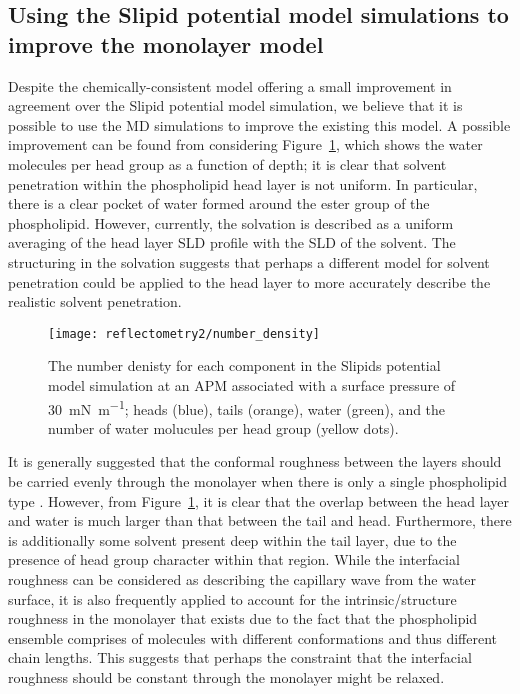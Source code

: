 \subsection{Using the Slipid potential model simulations to improve the monolayer model}
Despite the chemically-consistent model offering a small improvement in agreement over the Slipid potential model simulation, we believe that it is possible to use the MD simulations to improve the existing this model.
A possible improvement can be found from considering Figure~\ref{fig:nd}, which shows the water molecules per head group as a function of depth; it is clear that solvent penetration within the phospholipid head layer is not uniform.
In particular, there is a clear pocket of water formed around the ester group of the phospholipid.
However, currently, the solvation is described as a uniform averaging of the head layer SLD profile with the SLD of the solvent.
The structuring in the solvation suggests that perhaps a different model for solvent penetration could be applied to the head layer to more accurately describe the realistic solvent penetration.
%
\begin{figure}
    \centering
    \texttt{[image: reflectometry2/number\_density]}
    \caption{The number denisty for each component in the Slipids potential model simulation at an APM associated with a surface pressure of \SI{30}{\milli\newton\per\meter}; heads (blue), tails (orange), water (green), and the number of water molucules per head group (yellow dots).}
    \label{fig:nd}
\end{figure}
%

It is generally suggested that the conformal roughness between the layers should be carried evenly through the monolayer when there is only a single phospholipid type \cite{campbell_structure_2018}.
However, from Figure~\ref{fig:nd}, it is clear that the overlap between the head layer and water is much larger than that between the tail and head.
Furthermore, there is additionally some solvent present deep within the tail layer, due to the presence of head group character within that region.
While the interfacial roughness can be considered as describing the capillary wave from the water surface, it is also frequently applied to account for the intrinsic/structure roughness in the monolayer that exists due to the fact that the phospholipid ensemble comprises of molecules with different conformations and thus different chain lengths.
This suggests that perhaps the constraint that the interfacial roughness should be constant through the monolayer might be relaxed.
